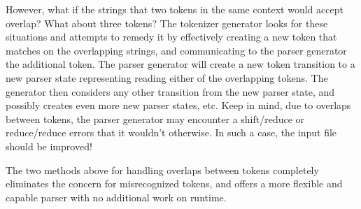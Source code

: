 {\begin{enumerate}
{			However, what if the strings that two tokens in the same context
			would accept overlap? What about three tokens?
			The tokenizer generator looks for these situations and attempts to
			remedy it by effectively creating a new token that matches on
			the overlapping strings, and communicating to the parser generator
			the additional token. The parser generator will create a new
			token transition to a new parser state representing reading either
			of the overlapping tokens. The generator then considers any other
			transition from the new parser state, and possibly creates even more
			new parser states, etc. Keep in mind, due to overlaps
			between tokens, the parser
			generator may encounter a shift/reduce or reduce/reduce errors
			that it wouldn't otherwise. In such a case, the input file
			should be improved!
			
			The two methods above for handling overlaps between tokens
			completely eliminates the concern for misrecognized tokens,
			and offers a more flexible and capable parser with no additional
			work on runtime.
	}
	\end{enumerate}
	
}






















